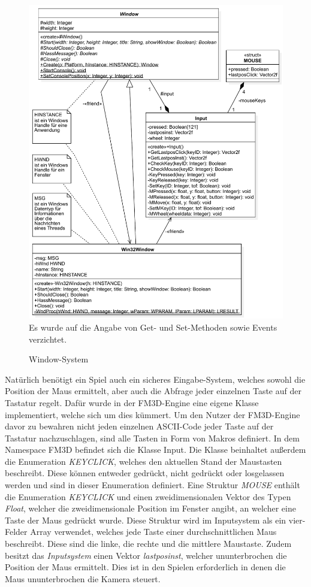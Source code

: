 \begin{figure}
	\begin{center}
		\includegraphics[width=\textwidth]{03unserprogramm/Engine/WindowSystem.pdf}
		Es wurde auf die Angabe von Get- und Set-Methoden sowie Events verzichtet.
		\caption{Window-System}\label{Windowsystem}
	\end{center}
\end{figure}

Natürlich benötigt ein Spiel auch ein sicheres Eingabe-System, welches sowohl die Position der Maus ermittelt, aber auch die Abfrage jeder einzelnen Taste auf der Tastatur regelt. 
Dafür wurde in der FM3D-Engine eine eigene Klasse implementiert, welche sich um dies kümmert.
Um den Nutzer der FM3D-Engine davor zu bewahren nicht jeden einzelnen ASCII-Code jeder Taste auf der Tastatur nachzuschlagen, sind alle Tasten in Form von Makros definiert. 
In dem Namespace FM3D befindet sich die Klasse Input. Die Klasse beinhaltet außerdem die Enumeration \textit{KEYCLICK}, welches den aktuellen Stand der Maustasten beschreibt. Diese können entweder gedrückt, nicht gedrückt oder losgelassen werden und sind in dieser Enumeration definiert.
Eine Struktur \textit{MOUSE} enthält die Enumeration \textit{KEYCLICK} und einen zweidimensionalen Vektor des Typen \textit{Float}, welcher die zweidimensionale Position im Fenster angibt, an welcher eine Taste der Maus gedrückt wurde.
Diese Struktur wird im Inputsystem als ein vier-Felder Array verwendet, welches jede Taste einer durchschnittlichen Maus beschreibt. Diese sind die linke, die rechte und die mittlere Maustaste. 
Zudem besitzt das \textit{Inputsystem} einen Vektor \textit{lastposinst}, welcher ununterbrochen die Position der Maus ermittelt. Dies ist in den Spielen erforderlich in denen die Maus ununterbrochen die Kamera steuert.

